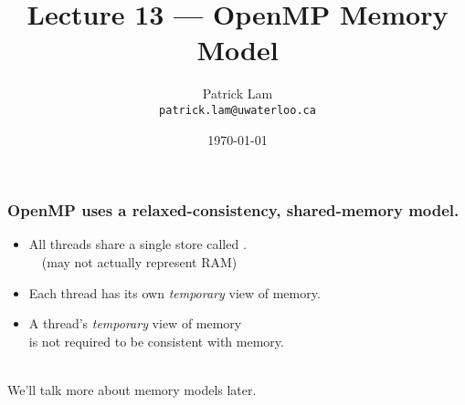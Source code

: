 

\title{Lecture 13 --- OpenMP Memory Model }

\author{Patrick Lam \\ \small \texttt{patrick.lam@uwaterloo.ca}}
\date{\today}




\begin{frame}
  \titlepage

 \end{frame}

\begin{frame}
  \frametitle{OpenMP uses a {\bf relaxed-consistency, shared-memory} model.}

  \begin{changemargin}{1cm}
\large

  \begin{itemize}
    \item All threads share a single store called
      .\\ ~~(may not actually represent RAM)\\[1em]
    \item Each thread has its own {\it temporary} view of memory.\\[1em]
    \item A thread's {\it temporary} view of memory\\ is not required to be
      consistent with memory.
  \end{itemize}~\\

  We'll talk more about memory models later.
  \end{changemargin}
  
\end{frame}

